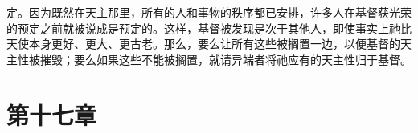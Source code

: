 定。因为既然在天主那里，所有的人和事物的秩序都已安排，许多人在基督获光荣的预定之前就被说成是预定的。这样，基督被发现是次于其他人，即使事实上祂比天使本身更好、更大、更古老。那么，要么让所有这些被搁置一边，以便基督的天主性被摧毁；要么如果这些不能被搁置，就请异端者将祂应有的天主性归于基督。\par


\section{第十七章}

\par

